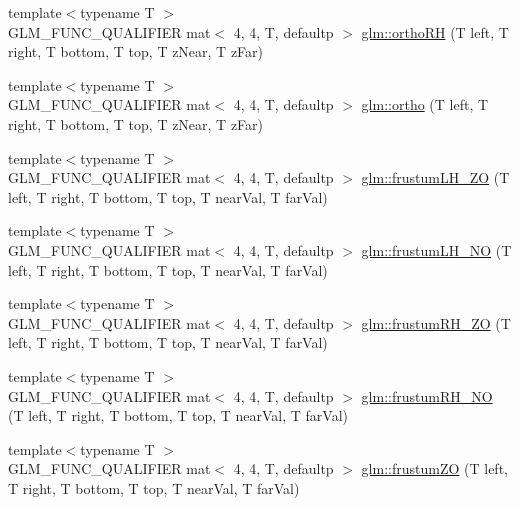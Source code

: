 \begin{DoxyCompactItemize}
\item 
{\footnotesize template$<$typename T $>$ }\\G\+L\+M\+\_\+\+F\+U\+N\+C\+\_\+\+Q\+U\+A\+L\+I\+F\+I\+ER mat$<$ 4, 4, T, defaultp $>$ \hyperlink{group__gtc__matrix__transform_ga16264c9b838edeb9dd1de7a1010a13a4}{glm\+::ortho\+RH} (T left, T right, T bottom, T top, T z\+Near, T z\+Far)
\item 
{\footnotesize template$<$typename T $>$ }\\G\+L\+M\+\_\+\+F\+U\+N\+C\+\_\+\+Q\+U\+A\+L\+I\+F\+I\+ER mat$<$ 4, 4, T, defaultp $>$ \hyperlink{group__gtc__matrix__transform_ga6615d8a9d39432e279c4575313ecb456}{glm\+::ortho} (T left, T right, T bottom, T top, T z\+Near, T z\+Far)
\item 
{\footnotesize template$<$typename T $>$ }\\G\+L\+M\+\_\+\+F\+U\+N\+C\+\_\+\+Q\+U\+A\+L\+I\+F\+I\+ER mat$<$ 4, 4, T, defaultp $>$ \hyperlink{group__gtc__matrix__transform_ga94218b094862d17798370242680b9030}{glm\+::frustum\+L\+H\+\_\+\+ZO} (T left, T right, T bottom, T top, T near\+Val, T far\+Val)
\item 
{\footnotesize template$<$typename T $>$ }\\G\+L\+M\+\_\+\+F\+U\+N\+C\+\_\+\+Q\+U\+A\+L\+I\+F\+I\+ER mat$<$ 4, 4, T, defaultp $>$ \hyperlink{group__gtc__matrix__transform_ga259520cad03b3f8bca9417920035ed01}{glm\+::frustum\+L\+H\+\_\+\+NO} (T left, T right, T bottom, T top, T near\+Val, T far\+Val)
\item 
{\footnotesize template$<$typename T $>$ }\\G\+L\+M\+\_\+\+F\+U\+N\+C\+\_\+\+Q\+U\+A\+L\+I\+F\+I\+ER mat$<$ 4, 4, T, defaultp $>$ \hyperlink{group__gtc__matrix__transform_ga7654a9227f14d5382786b9fc0eb5692d}{glm\+::frustum\+R\+H\+\_\+\+ZO} (T left, T right, T bottom, T top, T near\+Val, T far\+Val)
\item 
{\footnotesize template$<$typename T $>$ }\\G\+L\+M\+\_\+\+F\+U\+N\+C\+\_\+\+Q\+U\+A\+L\+I\+F\+I\+ER mat$<$ 4, 4, T, defaultp $>$ \hyperlink{group__gtc__matrix__transform_ga9236c8439f21be186b79c97b588836b9}{glm\+::frustum\+R\+H\+\_\+\+NO} (T left, T right, T bottom, T top, T near\+Val, T far\+Val)
\item 
{\footnotesize template$<$typename T $>$ }\\G\+L\+M\+\_\+\+F\+U\+N\+C\+\_\+\+Q\+U\+A\+L\+I\+F\+I\+ER mat$<$ 4, 4, T, defaultp $>$ \hyperlink{group__gtc__matrix__transform_gaa73322e152edf50cf30a6edac342a757}{glm\+::frustum\+ZO} (T left, T right, T bottom, T top, T near\+Val, T far\+Val)

\end{DoxyCompactItemize}

